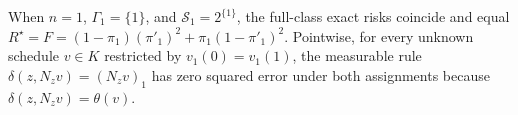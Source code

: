 When \(n=1\), \(\Gamma_1=\{1\}\), and \(\mathcal S_1=2^{\{1\}}\), the full-class exact risks coincide and equal \(R^{\star}=F=(1-\pi_1)(\pi'_1)^2+\pi_1(1-\pi'_1)^2\). Pointwise, for every unknown schedule \(v\in K\) restricted by \(v_1(0)=v_1(1)\), the measurable rule \(\delta(z,N_zv)=(N_zv)_1\) has zero squared error under both assignments because \(\delta(z,N_zv)=\theta(v)\).